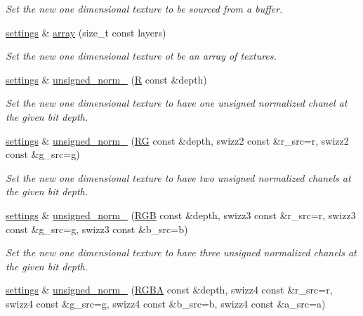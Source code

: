 \begin{DoxyCompactItemize}
\begin{DoxyCompactList}\small\item\em Set the new one dimensional texture to be sourced from a buffer. \end{DoxyCompactList}\item 
\hyperlink{classgfx_1_1texture__1D_1_1settings}{settings} \& \hyperlink{classgfx_1_1texture__1D_1_1settings_aae999450c31bbec16a96da49f129597a}{array} (size\-\_\-t const layers)
\begin{DoxyCompactList}\small\item\em Set the new one dimensional texture ot be an array of textures. \end{DoxyCompactList}\item 
\hyperlink{classgfx_1_1texture__1D_1_1settings}{settings} \& \hyperlink{classgfx_1_1texture__1D_1_1settings_af423fd89db99abc7ce90c2b4e75f86d4}{unsigned\-\_\-norm\-\_} (\hyperlink{classgfx_1_1R}{R} const \&depth)
\begin{DoxyCompactList}\small\item\em Set the new one dimensional texture to have one unsigned normalized chanel at the given bit depth. \end{DoxyCompactList}\item 
\hyperlink{classgfx_1_1texture__1D_1_1settings}{settings} \& \hyperlink{classgfx_1_1texture__1D_1_1settings_a1fb6f07db572d094e3a1690936e32a64}{unsigned\-\_\-norm\-\_} (\hyperlink{classgfx_1_1RG}{R\-G} const \&depth, swizz2 const \&r\-\_\-src=r, swizz2 const \&g\-\_\-src=g)
\begin{DoxyCompactList}\small\item\em Set the new one dimensional texture to have two unsigned normalized chanels at the given bit depth. \end{DoxyCompactList}\item 
\hyperlink{classgfx_1_1texture__1D_1_1settings}{settings} \& \hyperlink{classgfx_1_1texture__1D_1_1settings_a6c492599b997bd7c985ceb4352f7ec2e}{unsigned\-\_\-norm\-\_} (\hyperlink{classgfx_1_1RGB}{R\-G\-B} const \&depth, swizz3 const \&r\-\_\-src=r, swizz3 const \&g\-\_\-src=g, swizz3 const \&b\-\_\-src=b)
\begin{DoxyCompactList}\small\item\em Set the new one dimensional texture to have three unsigned normalized chanels at the given bit depth. \end{DoxyCompactList}\item 
\hyperlink{classgfx_1_1texture__1D_1_1settings}{settings} \& \hyperlink{classgfx_1_1texture__1D_1_1settings_a06eee82aacd6f0fd8006707b7ce39164}{unsigned\-\_\-norm\-\_} (\hyperlink{classgfx_1_1RGBA}{R\-G\-B\-A} const \&depth, swizz4 const \&r\-\_\-src=r, swizz4 const \&g\-\_\-src=g, swizz4 const \&b\-\_\-src=b, swizz4 const \&a\-\_\-src=a)

\end{DoxyCompactItemize}
